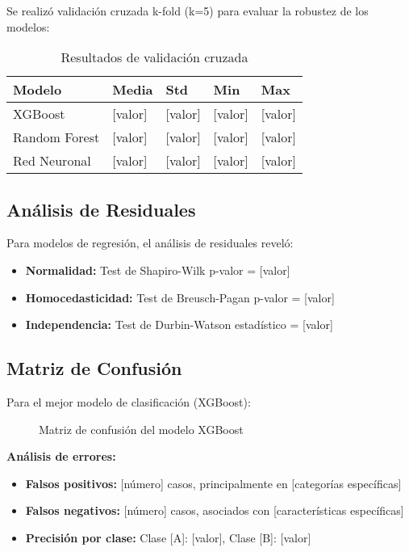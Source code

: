 Se realizó validación cruzada k-fold (k=5) para evaluar la robustez de los modelos:

\begin{table}[htbp]
\centering
\caption{Resultados de validación cruzada}
\begin{tabular}{@{}p{3cm}p{2cm}p{2cm}p{2cm}p{2cm}@{}}
\toprule
\textbf{Modelo} & \textbf{Media} & \textbf{Std} & \textbf{Min} & \textbf{Max} \\
\midrule
XGBoost & [valor] & [valor] & [valor] & [valor] \\
Random Forest & [valor] & [valor] & [valor] & [valor] \\
Red Neuronal & [valor] & [valor] & [valor] & [valor] \\
\bottomrule
\end{tabular}
\label{tab:validacion_cruzada}
\end{table}

\subsection{Análisis de Residuales}

Para modelos de regresión, el análisis de residuales reveló:

\begin{itemize}
    \item \textbf{Normalidad:} Test de Shapiro-Wilk p-valor = [valor]
    \item \textbf{Homocedasticidad:} Test de Breusch-Pagan p-valor = [valor]
    \item \textbf{Independencia:} Test de Durbin-Watson estadístico = [valor]
\end{itemize}

\subsection{Matriz de Confusión}

Para el mejor modelo de clasificación (XGBoost):

\begin{figure}[htbp]
\centering
\caption{Matriz de confusión del modelo XGBoost}
\label{fig:confusion_matrix}
\end{figure}

\textbf{Análisis de errores:}
\begin{itemize}
    \item \textbf{Falsos positivos:} [número] casos, principalmente en [categorías específicas]
    \item \textbf{Falsos negativos:} [número] casos, asociados con [características específicas]
    \item \textbf{Precisión por clase:} Clase [A]: [valor], Clase [B]: [valor]
\end{itemize}

